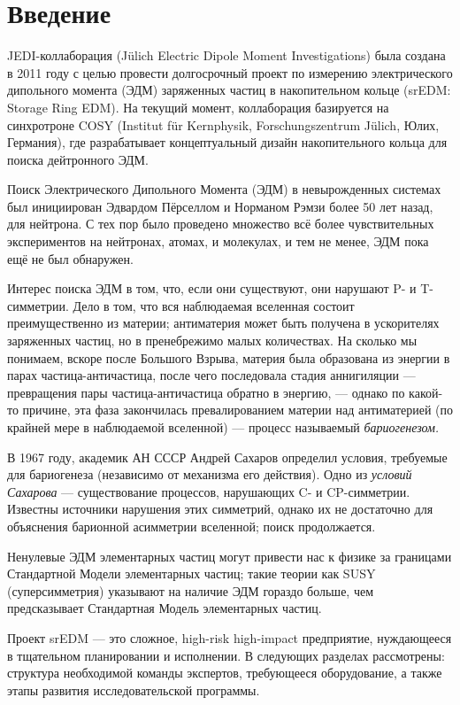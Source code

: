 \documentclass{extarticle}
\begin{document}


\tableofcontents
\pagebreak

\section*{Введение}
JEDI-коллаборация (J\"ulich Electric Dipole Moment Investigations) была создана в 2011 году с целью провести долгосрочный проект по измерению электрического дипольного момента (ЭДМ) заряженных частиц в накопительном кольце (srEDM: Storage Ring EDM). На текущий момент, коллаборация базируется на синхротроне COSY (Institut f\"ur Kernphysik, Forschungszentrum J\"ulich, Юлих, Германия), где разрабатывает концептуальный дизайн накопительного кольца для поиска дейтронного ЭДМ.

Поиск Электрического Дипольного Момента (ЭДМ) в невырожденных системах был инициирован Эдвардом Пёрселлом и Норманом Рэмзи более 50 лет назад, для нейтрона. С тех пор было проведено множество всё более чувствительных экспериментов на нейтронах, атомах, и молекулах, и тем не менее, ЭДМ пока ещё не был обнаружен. 

Интерес поиска ЭДМ в том, что, если они существуют, они нарушают P- и T-симметрии. Дело в том, что вся наблюдаемая вселенная состоит преимущественно из материи; антиматерия может быть получена в ускорителях заряженных частиц, но в пренебрежимо малых количествах. На сколько мы понимаем, вскоре после Большого Взрыва, материя была образована из энергии в парах частица-античастица, после чего последовала стадия аннигиляции --- превращения пары частица-античастица обратно в энергию, --- однако по какой-то причине, эта фаза закончилась превалированием материи над антиматерией (по крайней мере в наблюдаемой вселенной) --- процесс называемый \emph{бариогенезом.}

В 1967 году, академик АН СССР Андрей Сахаров определил условия, требуемые для бариогенеза (независимо от механизма его действия). Одно из \emph{условий Сахарова} --- существование процессов, нарушающих C- и CP-симметрии. Известны источники нарушения этих симметрий, однако их не достаточно для объяснения барионной асимметрии вселенной; поиск продолжается.

Ненулевые ЭДМ элементарных частиц могут привести нас к физике за границами Стандартной Модели элементарных частиц; такие теории как SUSY (суперсимметрия) указывают на наличие ЭДМ гораздо больше, чем предсказывает Стандартная Модель элементарных частиц.

Проект srEDM --- это сложное, high-risk high-impact предприятие, нуждающееся в тщательном планировании и исполнении. В следующих разделах рассмотрены: структура необходимой команды экспертов, требующееся оборудование, а также этапы развития исследовательской программы.
\end{document}
